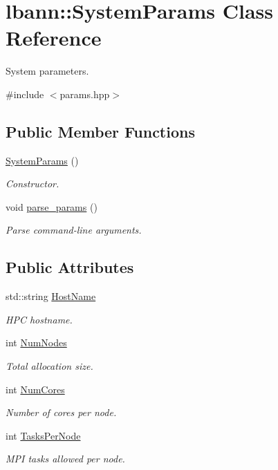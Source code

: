 \hypertarget{classlbann_1_1SystemParams}{}\section{lbann\+:\+:System\+Params Class Reference}
\label{classlbann_1_1SystemParams}


System parameters.  




{\ttfamily \#include $<$params.\+hpp$>$}

\subsection*{Public Member Functions}
\begin{DoxyCompactItemize}
\item 
\hyperlink{classlbann_1_1SystemParams_a74bc72829591193eef9a59d0d53f782f}{System\+Params} ()
\begin{DoxyCompactList}\small\item\em Constructor. \end{DoxyCompactList}\item 
void \hyperlink{classlbann_1_1SystemParams_a730176df36a262f7ef141afda372488d}{parse\+\_\+params} ()
\begin{DoxyCompactList}\small\item\em Parse command-\/line arguments. \end{DoxyCompactList}\end{DoxyCompactItemize}
\subsection*{Public Attributes}
\begin{DoxyCompactItemize}
\item 
std\+::string \hyperlink{classlbann_1_1SystemParams_a4aa517715ee0a454ee7ca2cc23fe30ee}{Host\+Name}
\begin{DoxyCompactList}\small\item\em H\+PC hostname. \end{DoxyCompactList}\item 
int \hyperlink{classlbann_1_1SystemParams_ad63e9fea31313d45d13298e35b47982a}{Num\+Nodes}
\begin{DoxyCompactList}\small\item\em Total allocation size. \end{DoxyCompactList}\item 
int \hyperlink{classlbann_1_1SystemParams_aa4f76625da59edc74b6d9208cb60a3db}{Num\+Cores}
\begin{DoxyCompactList}\small\item\em Number of cores per node. \end{DoxyCompactList}\item 
int \hyperlink{classlbann_1_1SystemParams_a93758103d73bcd95146f99464203aa86}{Tasks\+Per\+Node}
\begin{DoxyCompactList}\small\item\em M\+PI tasks allowed per node. \end{DoxyCompactList}\end{DoxyCompactItemize}


